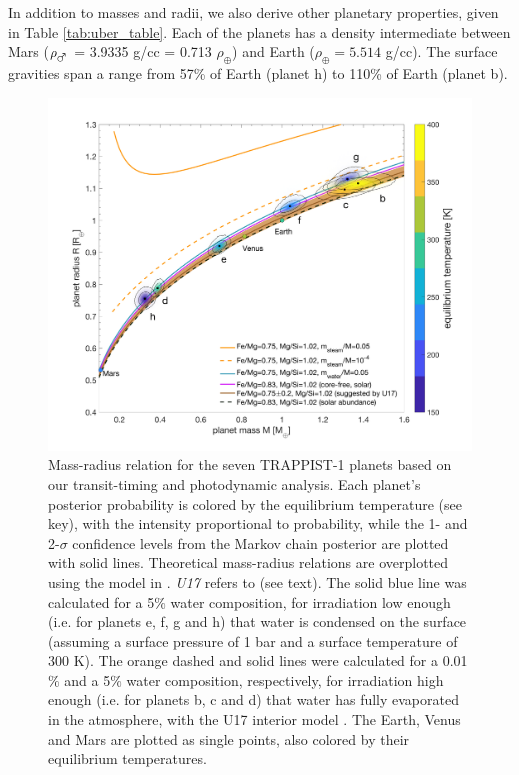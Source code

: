 \documentclass[fleqn,usenatbib]{mnras} %
\begin{document}
In addition to masses and radii, we also derive other planetary properties,
given in Table \ref{tab:uber_table}.  Each of the planets has a density
intermediate between Mars ($\rho_{\mars}$ = 3.9335 g/cc = 0.713 $\rho_\oplus$) and 
Earth ($\rho_\oplus = 5.514$ g/cc).  The surface gravities span a range
from 57\% of Earth (planet h) to 110\% of Earth (planet b).  

\begin{figure}
    \centering
   \includegraphics[width=\hsize]{figures/Figure_MR_v8.png}
    \caption{Mass-radius relation for the seven TRAPPIST-1 planets based on 
    our transit-timing and photodynamic analysis.  
    Each planet's posterior probability is colored by the equilibrium temperature
    (see key), with the intensity proportional to probability, while the 1- and 2-$\sigma$ 
    confidence levels from the Markov chain posterior are plotted with solid lines.  
    Theoretical mass-radius relations are overplotted using the model in \citet{Dorn2016}.  {\it U17} refers to \citet{Unterborn2018a} (see text).
     The solid blue line was calculated for a 5$\%$ water composition, for irradiation low enough (i.e. for planets e, f, g and h) that water is condensed on the surface  (assuming a surface pressure of 1 bar and a surface temperature of 300 K). The orange dashed and solid lines were calculated for a 0.01$\%$ and a 5$\%$ water composition, respectively, for irradiation high enough (i.e. for planets b, c and d) that water has fully evaporated in the atmosphere, with the U17 interior model \citep{Turbet2020}.
    The Earth, Venus and Mars are plotted as single points, also colored by their equilibrium temperatures.}
    \label{fig:mass_radius_relation}
\end{figure}
\end{document}
